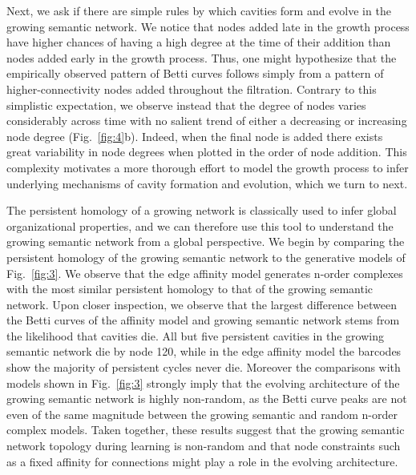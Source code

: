 \documentclass{article}
\begin{document}
Next, we ask if there are simple rules by which cavities form and evolve in the growing semantic network. We notice that nodes added late in the growth process have higher chances of having a high degree at the time of their addition than nodes added early in the growth process. Thus, one might hypothesize that the empirically observed pattern of Betti curves follows simply from a pattern of higher-connectivity nodes added throughout the filtration. Contrary to this simplistic expectation, we observe instead that the degree of nodes varies considerably across time with no salient trend of either a decreasing or increasing node degree (Fig.~\ref{fig:4}b). Indeed, when the final node is added there exists great variability in node degrees when plotted in the order of node addition. This complexity motivates a more thorough effort to model the growth process to infer underlying mechanisms of cavity formation and evolution, which we turn to next.

The persistent homology of a growing network is classically used to infer global organizational properties, and we can therefore use this tool to understand the growing semantic network from a global perspective. We begin by comparing the persistent homology of the growing semantic network to the generative models of Fig.~\ref{fig:3}. We observe that the edge affinity model generates n-order complexes with the most similar persistent homology to that of the growing semantic network. Upon closer inspection, we observe that the largest difference between the Betti curves of the affinity model and growing semantic network stems from the likelihood that cavities die. All but five persistent cavities in the growing semantic network die by node 120, while in the edge affinity model the barcodes show the majority of persistent cycles never die. Moreover the comparisons with models shown in Fig.~\ref{fig:3} strongly imply that the evolving architecture of the growing semantic network is highly non-random, as the Betti curve peaks are not even of the same magnitude between the growing semantic and random n-order complex models. Taken together, these results suggest that the growing semantic network topology during learning is non-random and that node constraints such as a fixed affinity for connections might play a role in the evolving architecture.
\end{document}
